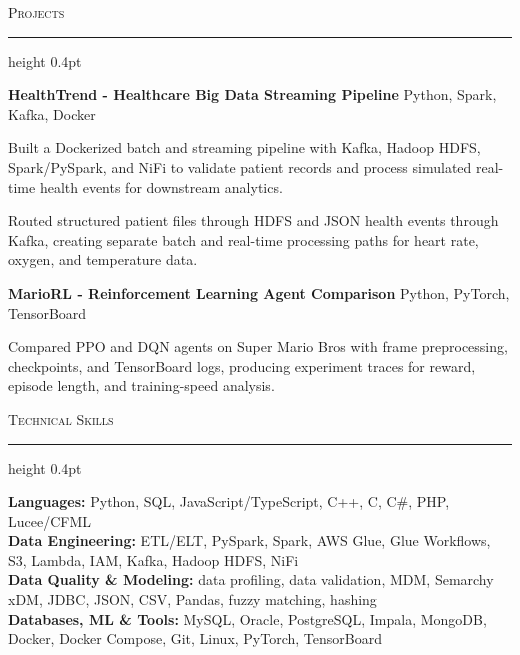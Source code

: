 \documentclass[letterpaper,11pt]{article}
\newcommand{\resumesection}[1]{%
  \par\vspace{2pt}%
  {\large\scshape #1}\par\vspace{2pt}%
  \hrule height 0.4pt\vspace{2pt}%
}
\newcommand{\projectHeading}[2]{
  \textbf{#1} \hfill #2
}
\begin{document}
\resumesection{Projects}
\projectHeading{HealthTrend - Healthcare Big Data Streaming Pipeline}{Python, Spark, Kafka, Docker}
\begin{tightitemize}
  \item Built a Dockerized batch and streaming pipeline with Kafka, Hadoop HDFS, Spark/PySpark, and NiFi to validate patient records and process simulated real-time health events for downstream analytics.
  \item Routed structured patient files through HDFS and JSON health events through Kafka, creating separate batch and real-time processing paths for heart rate, oxygen, and temperature data.
\end{tightitemize}

\projectHeading{MarioRL - Reinforcement Learning Agent Comparison}{Python, PyTorch, TensorBoard}
\begin{tightitemize}
  \item Compared PPO and DQN agents on Super Mario Bros with frame preprocessing, checkpoints, and TensorBoard logs, producing experiment traces for reward, episode length, and training-speed analysis.
\end{tightitemize}

\resumesection{Technical Skills}
\textbf{Languages:} Python, SQL, JavaScript/TypeScript, C++, C, C\#, PHP, Lucee/CFML\\
\textbf{Data Engineering:} ETL/ELT, PySpark, Spark, AWS Glue, Glue Workflows, S3, Lambda, IAM, Kafka, Hadoop HDFS, NiFi\\
\textbf{Data Quality \& Modeling:} data profiling, data validation, MDM, Semarchy xDM, JDBC, JSON, CSV, Pandas, fuzzy matching, hashing\\
\textbf{Databases, ML \& Tools:} MySQL, Oracle, PostgreSQL, Impala, MongoDB, Docker, Docker Compose, Git, Linux, PyTorch, TensorBoard
\end{document}
